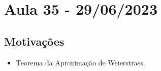 \documentclass[../analysis_notes.tex]{subfiles}
\begin{document}
\section{Aula 35 - 29/06/2023}
\subsection{Motivações}
\begin{itemize}
  \item Teorema da Aproximação de Weierstrass.
\end{itemize}
\end{document}

